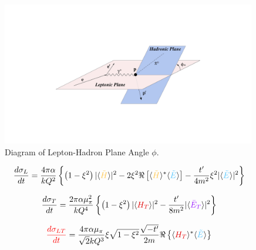            \begin{figure}[H]
                \centering
                \includegraphics[width=0.99\textwidth]{Chapters/Ch1-Intro/Ch1-Sec2-GPDs-DVMP/pics/lept_had_planes.png}
                \caption{Diagram of Lepton-Hadron Plane Angle $\phi$.}
                \label{fig:phi_trento}
            \end{figure}

        
        
         \begin{equation}\label{eq:sigmaL}
                 \textcolor{sigmaL}{\frac{d\sigma_{L}}{dt}} = 
                \frac{4\pi\alpha}{kQ^2}\left\{ \left( 1 - \xi^2 \right) 
                \lvert \langle \GPDHtildeEQ \rangle \rvert ^2 
                -2\xi^2 \Re \left[  \langle \GPDHtildeEQ \rangle ^* \langle \GPDEtildeEQ \rangle    \right] - \frac{t'}{4m^2}\xi^2
                \lvert \langle \GPDEtildeEQ \rangle \rvert ^2  \right\}
            \end{equation} 
        
            \begin{equation}\label{eq:sigmaT}
                \textcolor{sigmaT}{\frac{d\sigma_{T}}{dt}} = 
                \frac{2\pi\alpha \mu_{\pi}^2}{kQ^4}
                \left\{ \left( 1 - \xi^2 \right) 
                \lvert \langle \GPDHTEQ \rangle \rvert ^2
                - \frac{t'}{8m^2}
                \lvert \langle \GPDETbarEQ \rangle \rvert ^2  \right\}    
            \end{equation} 
            
            \begin{equation}\label{eq:sigmaLT}
                \textcolor{sigmaLT}{\frac{d\sigma_{LT}}{dt}} = 
                \frac{4\pi\alpha \mu_{\pi}}{\sqrt{2}kQ^3}
                \xi\sqrt{1-\xi^2}
                \frac{\sqrt{-t'}}{2m}
                \Re \left\{ 
                 \langle \GPDHTEQ \rangle ^*
                \langle \GPDEtildeEQ \rangle   
                \right\}
             \end{equation} 
            
